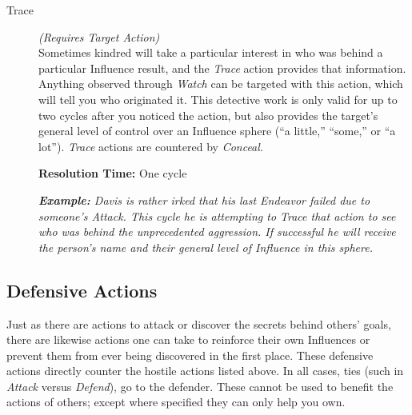\begin{description}
	\item[Trace] \emph{(Requires Target Action)} \hfill \\
		Sometimes kindred will take a particular interest in who was behind a particular Influence result, 
		and the \emph{Trace} action provides that information.  Anything observed through \emph{Watch} can 
		be targeted with this action, which will tell you who originated it.  This detective work is only 
		valid for up to two cycles after you noticed the action, but also provides the target's general level 
		of control over an Influence sphere (``a little,'' ``some,'' or ``a lot'').  \emph{Trace} actions are 
		countered by \emph{Conceal}.
		
		\textbf{Resolution Time:} One cycle
		
		\emph{\textbf{Example:} Davis is rather irked that his last \emph{Endeavor} failed due to someone's 
		\emph{Attack}. This cycle he is attempting to \emph{Trace} that action to see who was 
		behind the unprecedented aggression.  If successful he will receive the person's name 
		and their general level of Influence in this sphere.} \\
\end{description}

\subsection{Defensive Actions}
Just as there are actions to attack or discover the secrets behind others' goals, there are 
likewise actions one can take to reinforce their own Influences or prevent them from ever being 
discovered in the first place.  These defensive actions directly counter the hostile actions 
listed above.  In all cases, ties (such in \emph{Attack} versus \emph{Defend}), go to the defender.  
These cannot be used to benefit the actions of others; except where specified they can only help you own. \\

